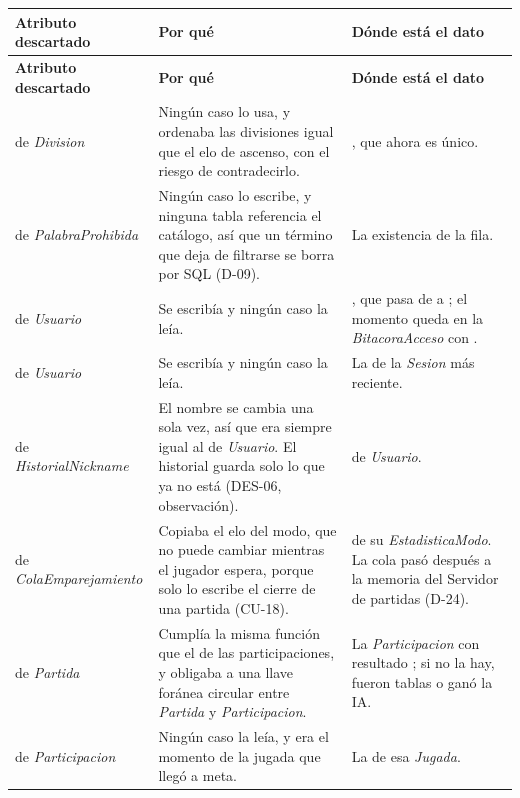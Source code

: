 \begin{center}\small
\begin{longtable}{|L{0.22\textwidth}|L{0.41\textwidth}|L{0.27\textwidth}|}
\hline
\textbf{Atributo descartado} & \textbf{Por qué} & \textbf{Dónde está el dato} \\ \hline
\endfirsthead
\hline
\textbf{Atributo descartado} & \textbf{Por qué} & \textbf{Dónde está el dato} \\ \hline
\endhead
{} de \textit{Division} & Ningún caso lo usa, y ordenaba las divisiones igual que el elo de ascenso, con el riesgo de contradecirlo. & , que ahora es único. \\ \hline
{} de \textit{PalabraProhibida} & Ningún caso lo escribe, y ninguna tabla referencia el catálogo, así que un término que deja de filtrarse se borra por SQL (\mbox{D-09}). & La existencia de la fila. \\ \hline
{} de \textit{Usuario} & Se escribía y ningún caso la leía. & , que pasa de  a ; el momento queda en la \textit{BitacoraAcceso} con . \\ \hline
{} de \textit{Usuario} & Se escribía y ningún caso la leía. & La  de la \textit{Sesion} más reciente. \\ \hline
{} de \textit{HistorialNickname} & El nombre se cambia una sola vez, así que era siempre igual al  de \textit{Usuario}. El historial guarda solo lo que ya no está (\mbox{DES-06}, observación). &  de \textit{Usuario}. \\ \hline
{} de \textit{ColaEmparejamiento} & Copiaba el elo del modo, que no puede cambiar mientras el jugador espera, porque solo lo escribe el cierre de una partida (\mbox{CU-18}). &  de su \textit{EstadisticaModo}. La cola pasó después a la memoria del Servidor de partidas (\mbox{D-24}). \\ \hline
{} de \textit{Partida} & Cumplía la misma función que el  de las participaciones, y obligaba a una llave foránea circular entre \textit{Partida} y \textit{Participacion}. & La \textit{Participacion} con resultado ; si no la hay, fueron tablas o ganó la IA. \\ \hline
{} de \textit{Participacion} & Ningún caso la leía, y era el momento de la jugada que llegó a meta. & La  de esa \textit{Jugada}. \\ \hline

\end{longtable}
\end{center}
